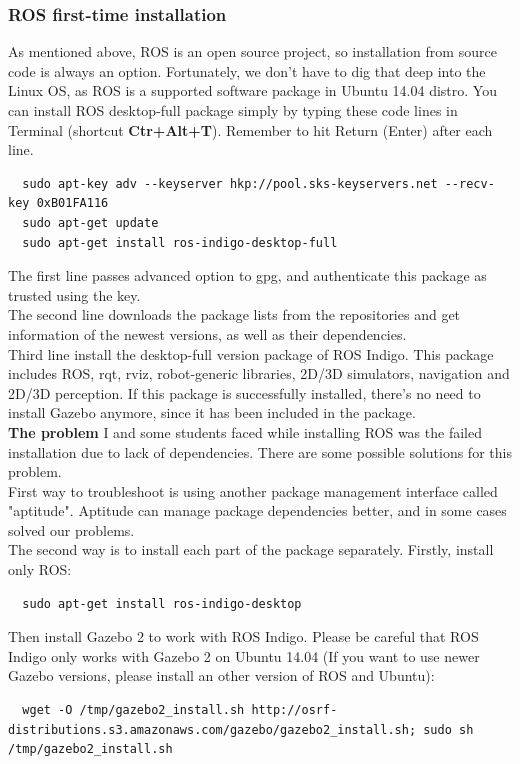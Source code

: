 \documentclass[pdftex,12pt,a4paper]{article}
\begin{document}
  \subsubsection{ROS first-time installation}
  As mentioned above, ROS is an open source project, so installation from source code is always an option. Fortunately, we don't have to dig that deep into the Linux OS, as ROS is a supported software package in Ubuntu 14.04 distro. You can install ROS desktop-full package simply by typing these code lines in Terminal (shortcut \textbf{Ctr+Alt+T}). Remember to hit Return (Enter) after each line.
  \begin{lstlisting}
  sudo apt-key adv --keyserver hkp://pool.sks-keyservers.net --recv-key 0xB01FA116
  sudo apt-get update
  sudo apt-get install ros-indigo-desktop-full
  \end{lstlisting}
  The first line passes advanced option to gpg, and authenticate this package as trusted using the key.\\
  The second line downloads the package lists from the repositories and get information of the newest versions, as well as their dependencies.\\
  Third line install the desktop-full version package of ROS Indigo. This package includes ROS, rqt, rviz, robot-generic libraries, 2D/3D simulators, navigation and 2D/3D perception. If this package is successfully installed, there's no need to install Gazebo anymore, since it has been included in the package.\\
  \textbf{The problem} I and some students faced while installing ROS was the failed installation due to lack of dependencies. There are some possible solutions for this problem.\\
  First way to troubleshoot is using another package management interface called "aptitude". Aptitude can manage package dependencies better, and in some cases solved our problems.\\
  The second way is to install each part of the package separately. Firstly, install only ROS:
  \begin{lstlisting}
  sudo apt-get install ros-indigo-desktop
  \end{lstlisting}
  Then install Gazebo 2 to work with ROS Indigo. Please be careful that ROS Indigo only works with Gazebo 2 on Ubuntu 14.04 (If you want to use newer Gazebo versions, please install an other version of ROS and Ubuntu):
  \begin{lstlisting}
  wget -O /tmp/gazebo2_install.sh http://osrf-distributions.s3.amazonaws.com/gazebo/gazebo2_install.sh; sudo sh /tmp/gazebo2_install.sh
  \end{lstlisting}
\end{document}
